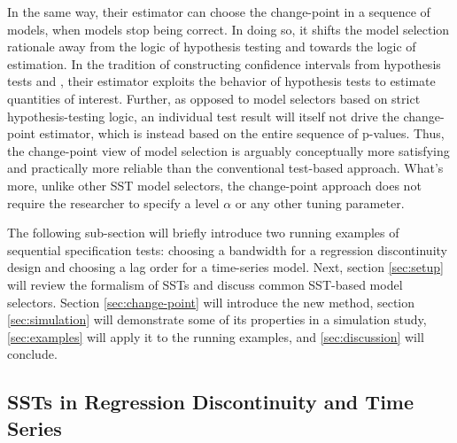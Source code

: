 \documentclass[12pt]{article}\usepackage[]{graphicx}\usepackage[]{color}
\begin{document}
In the same way, their estimator can choose the change-point in
a sequence of models, when models stop being correct.
In doing so, it shifts the model selection rationale away
from the logic of hypothesis testing and towards the logic of
estimation.
In the tradition of constructing confidence intervals from hypothesis
tests and \citet{hodgeslehmann}, their estimator exploits
the behavior of hypothesis tests to estimate quantities of interest.
Further, as opposed to model selectors based on strict
hypothesis-testing logic, an individual test result will itself not
drive the change-point estimator, which is instead based on the entire
sequence of p-values.
Thus, the change-point view of model selection is arguably conceptually
more satisfying and practically more reliable than the conventional
test-based approach.
What's more, unlike other SST model selectors, the change-point
approach does not require the researcher to specify a level $\alpha$
or any other tuning parameter.

The following sub-section will briefly introduce two running examples
of sequential specification tests: choosing a bandwidth for a
regression discontinuity design and choosing a lag order for a
time-series model.
Next, section \ref{sec:setup} will review the formalism of SSTs and
discuss common SST-based model selectors.
Section \ref{sec:change-point} will introduce the new method, section
\ref{sec:simulation} will demonstrate some of its properties in a
simulation study, \ref{sec:examples} will apply it to the running
examples, and \ref{sec:discussion} will conclude.

\subsection{SSTs in Regression Discontinuity and Time Series}\label{sec:exampleIntro}
\end{document}
